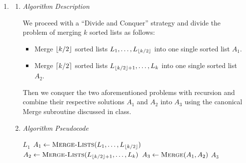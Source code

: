 \documentclass{article}
\begin{document}
\begin{enumerate}[leftmargin={*}, font={\bf}, label={\arabic*.}, ref={\arabic*}]
  \item \label{qst:1}
    \begin{enumerate}
      \item \label{qst:1a}
        {\it Algorithm Description}

        We proceed with a ``Divide and Conquer'' strategy and divide the problem of merging
        $k$ sorted lists as follows:

        \begin{itemize}[itemsep={-3pt}]
          \item
            Merge $\lfloor k/2\rfloor$ sorted lists $L_1,\dots,L_{\lfloor k/2\rfloor}$ into one single sorted
            list $A_1$.
          \item
            Merge $\lceil k/2\rceil$ sorted lists $L_{\lfloor k/2\rfloor + 1},\dots,L_k$ into one single sorted
            list $A_2$.
        \end{itemize}

        Then we conquer the two aforementioned problems with recursion and combine their respective
        solutions $A_1$ and $A_2$ into $A_3$ using the canonical {\sc Merge} subroutine discussed in
        class.

      \item \label{qst:1b}
        {\it Algorithm Pseudocode} \vspace{-\baselineskip}
        
        \begin{minipage}{\linewidth}
          \begin{algorithm}[H]
            \caption{$\textsc{Merge-Lists}(L_1, \ldots, L_k)$}\label{alg:merge-lists}
            \begin{algorithmic}[1]
               
                \State \Return $L_1$
              \EndIf
              \State $A_1 \gets \Call{Merge-Lists}{L_1, \ldots, L_{\floor{k/2}}}$ 
              \State $A_2 \gets \Call{Merge-Lists}{L_{\floor{k/2} + 1}, \ldots, L_k}$ 
              \State $A_3 \gets \Call{Merge}{A_1, A_2}$ 
              \State \Return $A_3$ 
            \end{algorithmic}
          \end{algorithm}
        \end{minipage}


\end{enumerate}
\end{enumerate}
\end{document}
